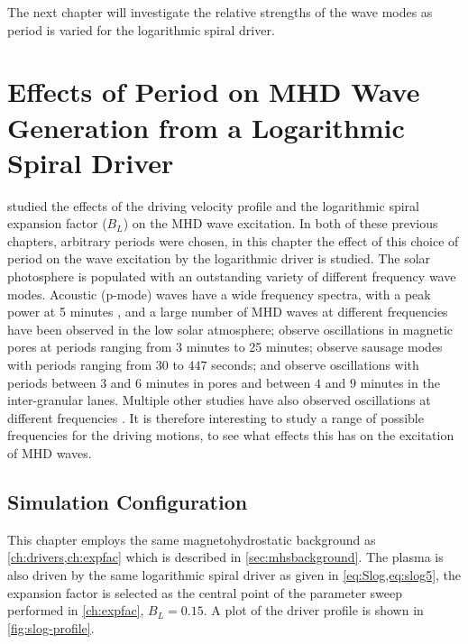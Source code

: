 \documentclass[a4paper,12pt,fourier,authoryear,custommargin]{Classes/PhDThesisPSnPDF}
\begin{document}
The next chapter will investigate the relative strengths of the wave modes as period is varied for the logarithmic spiral driver.

\clearpage{}%
%

%
\clearpage{}%

\chapter{Effects of Period on MHD Wave Generation from a Logarithmic Spiral Driver}\label{ch:period}

 studied the effects of the driving velocity profile and the logarithmic spiral expansion factor ($B_L$) on the MHD wave excitation.
In both of these previous chapters, arbitrary periods were chosen, in this chapter the effect of this choice of period on the wave excitation by the logarithmic driver is studied.
The solar photosphere is populated with an outstanding variety of different frequency wave modes.
Acoustic (p-mode) waves have a wide frequency spectra, with a peak power at 5 minutes \citep{leighton1962}, and a large number of MHD waves at different frequencies have been observed in the low solar atmosphere; \cite{Freij2014,Dorotovic2014} observe oscillations in magnetic pores at periods ranging from 3 minutes to 25 minutes; \cite{morton2011} observe sausage modes with periods ranging from $30$ to $447$ seconds; and \cite{fujimura2009} observe oscillations with periods between $3$ and $6$ minutes in pores and between $4$ and $9$ minutes in the inter-granular lanes.
Multiple other studies have also observed oscillations at different frequencies  \cite[e.g.][]{mathioudakis2013,reznikova2012,morton2012,mcintosh2011,zaqarashvili2009,jess2009,vecchio2007,kobanov2006,bogdan2006}.
It is therefore interesting to study a range of possible frequencies for the driving motions, to see what effects this has on the excitation of MHD waves.

\section{Simulation Configuration}\label{sec:periodconfig}
This chapter employs the same magnetohydrostatic background as \cref{ch:drivers,ch:expfac} which is described in \cref{sec:mhsbackground}.
The plasma is also driven by the same logarithmic spiral driver as given in \cref{eq:Slog,eq:slog5}, the expansion factor is selected as the central point of the parameter sweep performed in \cref{ch:expfac}, $B_L=0.15$.
A plot of the driver profile is shown in \cref{fig:slog-profile}.
\end{document}
